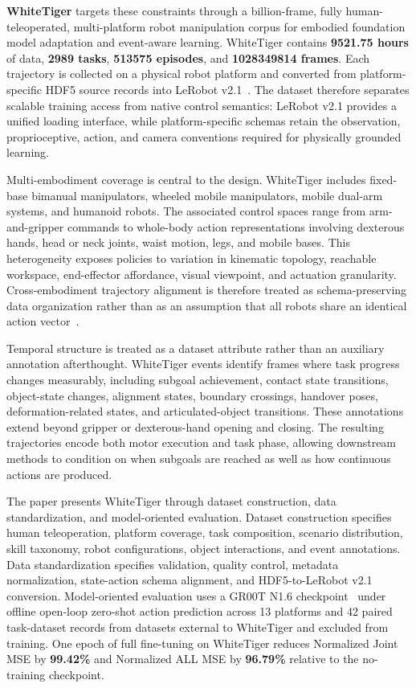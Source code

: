 \textbf{WhiteTiger} targets these constraints through a billion-frame, fully human-teleoperated, multi-platform robot manipulation corpus for embodied foundation model adaptation and event-aware learning. WhiteTiger contains \textbf{9521.75 hours} of data, \textbf{2989 tasks}, \textbf{513575 episodes}, and \textbf{1028349814 frames}. Each trajectory is collected on a physical robot platform and converted from platform-specific HDF5 source records into LeRobot v2.1~\cite{cadene2026lerobot}. The dataset therefore separates scalable training access from native control semantics: LeRobot v2.1 provides a unified loading interface, while platform-specific schemas retain the observation, proprioceptive, action, and camera conventions required for physically grounded learning.

Multi-embodiment coverage is central to the design. WhiteTiger includes fixed-base bimanual manipulators, wheeled mobile manipulators, mobile dual-arm systems, and humanoid robots. The associated control spaces range from arm-and-gripper commands to whole-body action representations involving dexterous hands, head or neck joints, waist motion, legs, and mobile bases. This heterogeneity exposes policies to variation in kinematic topology, reachable workspace, end-effector affordance, visual viewpoint, and actuation granularity. Cross-embodiment trajectory alignment is therefore treated as schema-preserving data organization rather than as an assumption that all robots share an identical action vector~\cite{bousmalis2023robocat,ghosh2024octo,xu2023xskill,liu2024rdt1b}.

Temporal structure is treated as a dataset attribute rather than an auxiliary annotation afterthought. WhiteTiger events identify frames where task progress changes measurably, including subgoal achievement, contact state transitions, object-state changes, alignment states, boundary crossings, handover poses, deformation-related states, and articulated-object transitions. These annotations extend beyond gripper or dexterous-hand opening and closing. The resulting trajectories encode both motor execution and task phase, allowing downstream methods to condition on when subgoals are reached as well as how continuous actions are produced.

The paper presents WhiteTiger through dataset construction, data standardization, and model-oriented evaluation. Dataset construction specifies human teleoperation, platform coverage, task composition, scenario distribution, skill taxonomy, robot configurations, object interactions, and event annotations. Data standardization specifies validation, quality control, metadata normalization, state-action schema alignment, and HDF5-to-LeRobot v2.1 conversion. Model-oriented evaluation uses a GR00T N1.6 checkpoint~\cite{nvidia2025grootn1} under offline open-loop zero-shot action prediction across 13 platforms and 42 paired task-dataset records from datasets external to WhiteTiger and excluded from training. One epoch of full fine-tuning on WhiteTiger reduces Normalized Joint MSE by \textbf{99.42\%} and Normalized ALL MSE by \textbf{96.79\%} relative to the no-training checkpoint.


